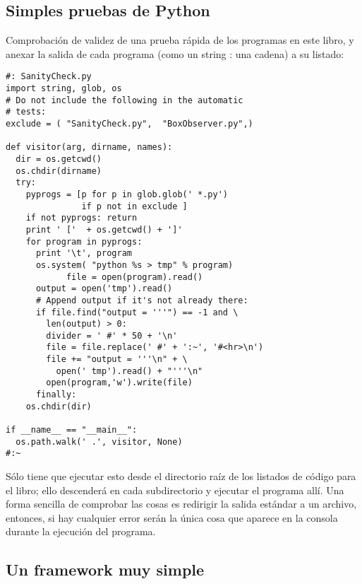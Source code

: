 \subsection*{Simples pruebas de Python}
\label{subsec:spdp}


Comprobación de validez de una prueba rápida de los programas en este libro, y anexar la salida de cada programa (como un string : una cadena) a su listado:     \newline

 \begin{lstlisting} 
#: SanityCheck.py 
import string, glob, os 
# Do not include the following in the automatic 
# tests: 
exclude = ( "SanityCheck.py",  "BoxObserver.py",) 

def visitor(arg, dirname, names): 
  dir = os.getcwd() 
  os.chdir(dirname) 
  try: 
    pyprogs = [p for p in glob.glob(' *.py')  
               if p not in exclude ] 
    if not pyprogs: return 
    print ' ['  + os.getcwd() + ']' 
    for program in pyprogs: 
      print '\t', program 
      os.system( "python %s > tmp" % program) 
            file = open(program).read() 
      output = open('tmp').read() 
      # Append output if it's not already there: 
      if file.find("output = '''") == -1 and \ 
        len(output) > 0: 
        divider = ' #' * 50 + '\n' 
        file = file.replace(' #' + ':~', '#<hr>\n') 
        file += "output = '''\n" + \ 
          open(' tmp').read() + "'''\n" 
        open(program,'w').write(file) 
      finally: 
    os.chdir(dir) 
    
if __name__ == "__main__": 
  os.path.walk(' .', visitor, None) 
#:~     
 \end{lstlisting}

Sólo tiene que ejecutar esto desde el directorio raíz de los listados de código para el libro; ello descenderá en cada subdirectorio y ejecutar el programa allí. Una forma sencilla de comprobar las cosas es redirigir la salida estándar a un archivo, entonces, si hay cualquier error serán la única cosa que aparece en la consola durante la ejecución del programa. 

\subsection*{Un framework muy simple}
\label{subsec:ufms}

